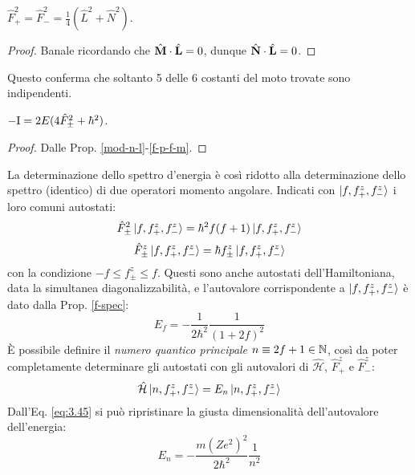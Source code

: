 \begin{proposition}\label{f-p-f-m}
	$ \hat{F}_+^2 = \hat{F}_-^2 = \frac{1}{4} (\hat{L}^2 + \hat{N}^2) $.
\end{proposition}
\begin{proof}
	Banale ricordando che $ \hat{\mathbf{M}} \cdot \hat{\mathbf{L}} = 0 $, dunque $ \hat{\mathbf{N}} \cdot \hat{\mathbf{L}} = 0 $.
\end{proof}

Questo conferma che soltanto 5 delle 6 costanti del moto trovate sono indipendenti.

\begin{proposition}\label{f-spec}
	$ -\mathrm{I} = 2E (4\hat{F}_{\pm}^2 + \hbar^2) $.
\end{proposition}
\begin{proof}
	Dalle Prop. \ref{mod-n-l}-\ref{f-p-f-m}.
\end{proof}

La determinazione dello spettro d'energia è così ridotto alla determinazione dello spettro (identico) di due operatori momento angolare. Indicati con $ \ket{f,f_+^z,f_-^z} $ i loro comuni autostati:
\begin{equation}
	\hat{F}_{\pm}^2 \ket{f,f_+^z,f_-^z} = \hbar^2 f (f + 1) \ket{f,f_+^z,f_-^z}
	\label{eq:3.58}
\end{equation}
\begin{equation}
	\hat{F}_{\pm}^z \ket{f,f_+^z,f_-^z} = \hbar f_{\pm}^z \ket{f,f_+^z,f_-^z}
	\label{eq:3.59}
\end{equation}
con la condizione $ -f \le f_{\pm}^z \le f $. Questi sono anche autostati dell'Hamiltoniana, data la simultanea diagonalizzabilità, e l'autovalore corrispondente a $ \ket{f,f_+^z,f_-^z} $ è dato dalla Prop. \ref{f-spec}:
\begin{equation}
	E_f = -\frac{1}{2\hbar^2} \frac{1}{(1 + 2f)^2}
	\label{eq:3.60}
\end{equation}
È possibile definire il \textit{numero quantico principale} $ n \equiv 2f + 1 \in \mathbb{N} $, così da poter completamente determinare gli autostati con gli autovalori di $ \hat{\mathcal{H}} $, $ \hat{F}_+^z $ e $ \hat{F}_-^z $:
\begin{equation}
	\hat{\mathcal{H}} \ket{n,f_+^z,f_-^z} = E_n \ket{n,f_+^z,f_-^z}
	\label{eq:3.61}
\end{equation}
Dall'Eq. \ref{eq:3.45} si può ripristinare la giusta dimensionalità dell'autovalore dell'energia:
\begin{equation}
	E_n = - \frac{m (Ze^2)^2}{2\hbar^2} \frac{1}{n^2}
	\label{eq:3.62}
\end{equation}

